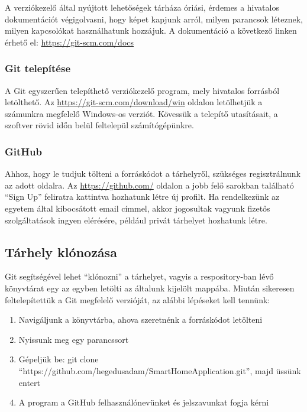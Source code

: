 \documentclass[a4paper,12pt]{report}
\begin{document}
    A verziókezelő által nyújtott lehetőségek tárháza óriási, érdemes a hivatalos dokumentációt végigolvasni, hogy képet kapjunk arról,
    milyen parancsok léteznek, milyen kapcsolókat használhatunk hozzájuk. A dokumentáció a következő linken érhető el: \url{https://git-scm.com/docs}

\subsubsection{Git telepítése}
    A Git egyszerűen telepíthető verziókezelő program, mely hivatalos forrásból letölthető. Az \url{https://git-scm.com/download/win} oldalon
    letölhetjük a számunkra megfelelő Windows-os verziót. Kövessük a telepítő utasításait, a szoftver rövid időn belül feltelepül számítógépünkre.

\subsubsection{GitHub}
    Ahhoz, hogy le tudjuk tölteni a forráskódot a tárhelyről, szükséges regisztrálnunk az adott oldalra. Az \url{https://github.com/} oldalon
    a jobb felő sarokban található ``Sign Up'' feliratra kattintva hozhatunk létre új profilt. Ha rendelkezünk az egyetem által kibocsátott
    email címmel, akkor jogosultak vagyunk fizetős szolgáltatások ingyen elérésére, például privát tárhelyet hozhatunk létre.

\subsection{Tárhely klónozása}
    Git segítségével lehet ``klónozni'' a tárhelyet, vagyis a respository-ban lévő könyvtárat egy az egyben letölti az általunk kijelölt
    mappába. Miután sikeresen feltelepítettük a Git megfelelő verzióját, az alábbi lépéseket kell tennünk:

\begin{enumerate}
    \item Navigáljunk a könyvtárba, ahova szeretnénk a forráskódot letölteni
    \item Nyissunk meg egy parancssort
    \item Gépeljük be: git clone ``https://github.com/hegedusadam/SmartHomeApplication.git'', majd üssünk entert
    \item A program a GitHub felhasználónevünket és jelszavunkat fogja kérni
\end{enumerate}
\end{document}
